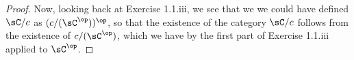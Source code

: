\documentclass[main.tex]{subfiles}
\begin{document}
\begin{proof}
	Now, looking back at Exercise 1.1.iii, we see that we we could have defined
	\(\sC/c\) as \((c/(\sC^\op))^\op\), so that the existence of the category
	\(\sC/c\) follows from the existence of \(c/(\sC^\op)\), which we have by
	the first part of Exercise 1.1.iii applied to \(\sC^\op\).
\end{proof}
\end{document}
